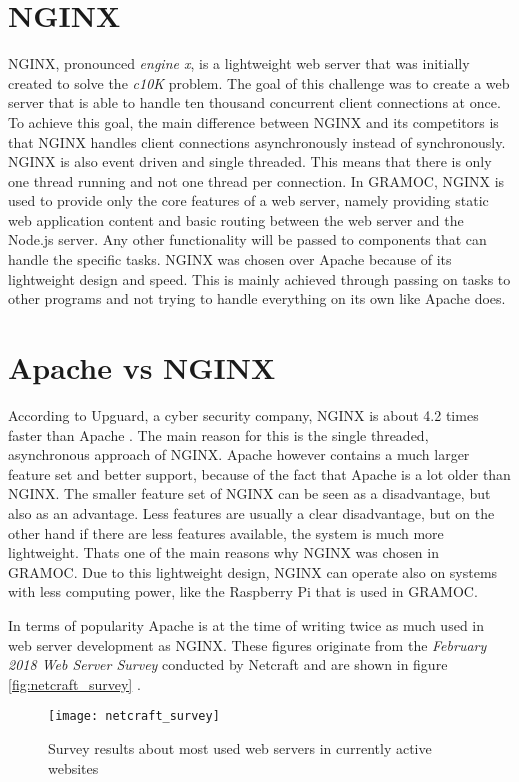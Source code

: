 \section{NGINX}
NGINX, pronounced \textit{engine x}, is a lightweight web server that was initially created to solve the \textit{c10K} problem. The goal of this challenge was to create a web server that is able to handle ten thousand concurrent client connections at once. To achieve this goal, the main difference between NGINX and its competitors is that NGINX handles client connections asynchronously instead of synchronously. NGINX is also event driven and single threaded. This means that there is only one thread running and not one thread per connection. In GRAMOC, NGINX is used to provide only the core features of a web server, namely providing static web application content and basic routing between the web server and the Node.js server. Any other functionality will be passed to components that can handle the specific tasks. NGINX was chosen over Apache because of its lightweight design and speed. This is mainly achieved through passing on tasks to other programs and not trying to handle everything on its own like Apache does.

\section{Apache vs NGINX}
According to Upguard, a cyber security company, NGINX is about 4.2 times faster than Apache \autocite{UpguardAvN}. The main reason for this is the single threaded, asynchronous approach of NGINX.
Apache however contains a much larger feature set and better support, because of the fact that Apache is a lot older than NGINX. The smaller feature set of NGINX can be seen as a disadvantage, but also as an advantage. Less features are usually a clear disadvantage, but on the other hand if there are less features available, the system is much more lightweight. Thats one of the main reasons why NGINX was chosen in GRAMOC. Due to this lightweight design, NGINX can operate also on systems with less computing power, like the Raspberry Pi that is used in GRAMOC.

In terms of popularity Apache is at the time of writing twice as much used in web server development as NGINX. These figures originate from the \textit{February 2018 Web Server Survey} conducted by Netcraft and are shown in figure \vref{fig:netcraft_survey} \autocite{netcraft_survey}.

\begin{figure}[h]
    \centering
    \texttt{[image: netcraft\_survey]}
    \caption{Survey results about most used web servers in currently active websites}
    \label{fig:netcraft_survey}
\end{figure}

